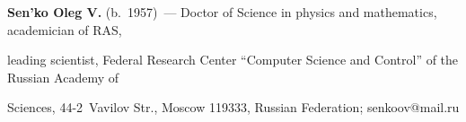 \vspace*{3pt}





\noindent


\textbf{Sen'ko Oleg V.} (b.\ 1957)~--- Doctor of Science in physics and mathematics, academician of RAS, 


leading scientist, Federal Research Center ``Computer Science and Control'' of the Russian Academy of 


Sciences, 44-2~Vavilov Str., Moscow 119333, Russian Federation; \mbox{senkoov@mail.ru}


  


\label{end\stat}





\renewcommand{\bibname}{\protect\rm Литература} 


  


